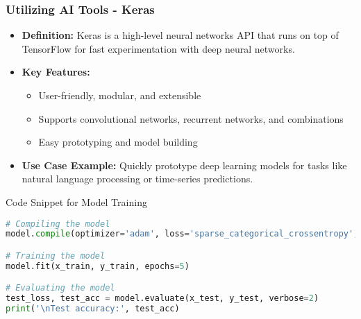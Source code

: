 \documentclass[aspectratio=169]{beamer}
\begin{document}
\begin{frame}[fragile]
    \frametitle{Utilizing AI Tools - Keras}
    \begin{itemize}
        \item \textbf{Definition:} Keras is a high-level neural networks API that runs on top of TensorFlow for fast experimentation with deep neural networks.
        \item \textbf{Key Features:}
        \begin{itemize}
            \item User-friendly, modular, and extensible
            \item Supports convolutional networks, recurrent networks, and combinations
            \item Easy prototyping and model building
        \end{itemize}
        \item \textbf{Use Case Example:} Quickly prototype deep learning models for tasks like natural language processing or time-series predictions.
    \end{itemize}
    \begin{block}{Code Snippet for Model Training}
    \begin{lstlisting}[language=Python]
# Compiling the model
model.compile(optimizer='adam', loss='sparse_categorical_crossentropy', metrics=['accuracy'])

# Training the model
model.fit(x_train, y_train, epochs=5)

# Evaluating the model
test_loss, test_acc = model.evaluate(x_test, y_test, verbose=2)
print('\nTest accuracy:', test_acc)
    \end{lstlisting} 
    \end{block}
\end{frame}
\end{document}
